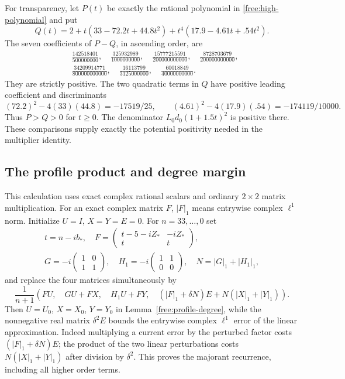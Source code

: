 \documentclass[11pt]{article}
\numberwithin{equation}{section}
\theoremstyle{definition}
\theoremstyle{remark}
\begin{document}
For transparency, let $P(t)$ be exactly the rational polynomial in
\eqref{free:high-polynomial} and put
\[
 Q(t)=2+t(33-72.2t+44.8t^2)+t^4(17.9-4.61t+.54t^2).
\]
The seven coefficients of $P-Q$, in ascending order, are
\begin{equation}\label{cert:high-difference}
 \begin{split}
 &\frac{142518401}{500000000},\quad
 \frac{325932989}{1000000000},\quad
 \frac{15777215591}{200000000000},\quad
 \frac{8728703679}{200000000000},\\
 &\frac{34209914771}{800000000000},\quad
 \frac{16113799}{3125000000},\quad
 \frac{60018849}{40000000000}.
 \end{split}
\end{equation}
They are strictly positive.  The two quadratic terms in $Q$ have
positive leading coefficient and discriminants
\[
 (72.2)^2-4(33)(44.8)=-17519/25,\qquad
 (4.61)^2-4(17.9)(.54)=-174119/10000.
\]
Thus $P>Q>0$ for $t\ge0$.  The denominator $L_0d_0(1+1.5t)^2$
is positive there.  These comparisons supply exactly the potential
positivity needed in the multiplier identity.

\subsection{The profile product and degree margin}\label{cert:profile}

This calculation uses exact complex rational scalars and ordinary
$2\times2$ matrix multiplication.  For an exact complex matrix $F$,
$|F|_1$ means entrywise complex $\ell^1$ norm.  Initialize
$U=I$, $X=Y=E=0$.  For $n=33,\ldots,0$ set
\[
 \begin{gathered}
 t=n-ib_*,\quad
 F=\begin{pmatrix}t-5-iZ_*&-iZ_*\\t&t\end{pmatrix},\\
 G=-i\begin{pmatrix}1&0\\1&1\end{pmatrix},\quad
 H_1=-i\begin{pmatrix}1&1\\0&0\end{pmatrix},\quad N=|G|_1+|H_1|_1,
 \end{gathered}
\]
and replace the four matrices simultaneously by
\begin{equation}\label{cert:profile-recipe}
 \frac1{n+1}\left(
 FU,\quad GU+FX,\quad H_1U+FY,\quad
 (|F|_1+\delta N)E+N(|X|_1+|Y|_1)\right).
\end{equation}
Then $U=U_0$, $X=X_0$, $Y=Y_0$ in
Lemma~\ref{free:profile-degree}, while the nonnegative real matrix
$\delta^2E$ bounds the entrywise complex $\ell^1$ error of the
linear approximation.  Indeed multiplying a current error by the
perturbed factor costs $(|F|_1+\delta N)E$; the product of the two
linear perturbations costs $N(|X|_1+|Y|_1)$ after division by
$\delta^2$.  This proves the majorant recurrence, including all
higher order terms.
\end{document}
